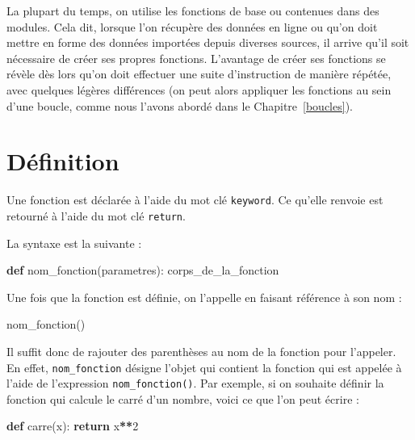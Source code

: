\documentclass[
  12pt,
]{book}
\newenvironment{Shaded}{\begin{snugshade}}{\end{snugshade}}
\newcommand{\ControlFlowTok}[1]{\textcolor[rgb]{0.13,0.29,0.53}{\textbf{#1}}}
\newcommand{\DecValTok}[1]{\textcolor[rgb]{0.00,0.00,0.81}{#1}}
\newcommand{\KeywordTok}[1]{\textcolor[rgb]{0.13,0.29,0.53}{\textbf{#1}}}
\newcommand{\NormalTok}[1]{#1}
\newcommand{\OperatorTok}[1]{\textcolor[rgb]{0.81,0.36,0.00}{\textbf{#1}}}
\numberwithin{equation}{section}
\numberwithin{countremarque}{section}
\begin{document}
La plupart du temps, on utilise les fonctions de base ou contenues dans des modules. Cela dit, lorsque l'on récupère des données en ligne ou qu'on doit mettre en forme des données importées depuis diverses sources, il arrive qu'il soit nécessaire de créer ses propres fonctions. L'avantage de créer ses fonctions se révèle dès lors qu'on doit effectuer une suite d'instruction de manière répétée, avec quelques légères différences (on peut alors appliquer les fonctions au sein d'une boucle, comme nous l'avons abordé dans le Chapitre~\ref{boucles}).

\section{Définition}\label{duxe9finition}

Une fonction est déclarée à l'aide du mot clé \texttt{keyword}. Ce qu'elle renvoie est retourné à l'aide du mot clé \texttt{return}.

La syntaxe est la suivante :

\begin{Shaded}
\begin{Highlighting}[]
\KeywordTok{def}\NormalTok{ nom\_fonction(parametres):}
\NormalTok{  corps\_de\_la\_fonction}
\end{Highlighting}
\end{Shaded}

Une fois que la fonction est définie, on l'appelle en faisant référence à son nom :

\begin{Shaded}
\begin{Highlighting}[]
\NormalTok{nom\_fonction()}
\end{Highlighting}
\end{Shaded}

Il suffit donc de rajouter des parenthèses au nom de la fonction pour l'appeler. En effet, \texttt{nom\_fonction} désigne l'objet qui contient la fonction qui est appelée à l'aide de l'expression \texttt{nom\_fonction()}.
Par exemple, si on souhaite définir la fonction qui calcule le carré d'un nombre, voici ce que l'on peut écrire :

\begin{Shaded}
\begin{Highlighting}[]
\KeywordTok{def}\NormalTok{ carre(x):}
  \ControlFlowTok{return}\NormalTok{ x}\OperatorTok{**}\DecValTok{2}
\end{Highlighting}
\end{Shaded}
\end{document}
